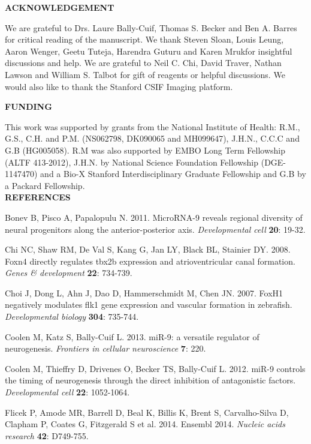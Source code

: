 \documentclass[]{article}
\begin{document}
\textbf{ACKNOWLEDGEMENT}

We are grateful to Drs. Laure Bally-Cuif, Thomas S. Becker and Ben A.
Barres for critical reading of the manuscript. We thank Steven Sloan,
Louis Leung, Aaron Wenger, Geetu Tuteja, Harendra Guturu and Karen
Mrukfor insightful discussions and help. We are grateful to Neil C. Chi,
David Traver, Nathan Lawson and William S. Talbot for gift of reagents
or helpful discussions. We would also like to thank the Stanford CSIF
Imaging platform.

\textbf{FUNDING}

This work was supported by grants from the National Institute of Health:
R.M., G.S., C.H. and P.M. (NS062798, DK090065 and MH099647), J.H.N.,
C.C.C and G.B (HG005058). R.M was also supported by EMBO Long Term
Fellowship (ALTF 413-2012), J.H.N. by National Science Foundation
Fellowship (DGE-1147470) and a Bio-X Stanford Interdisciplinary Graduate
Fellowship and G.B by a Packard Fellowship.\textbf{\\
REFERENCES}

\protect\hypertarget{_ENREF_1}{}{}Bonev B, Pisco A, Papalopulu N. 2011.
MicroRNA-9 reveals regional diversity of neural progenitors along the
anterior-posterior axis. \emph{Developmental cell} \textbf{20}: 19-32.

\protect\hypertarget{_ENREF_2}{}{}Chi NC, Shaw RM, De Val S, Kang G, Jan
LY, Black BL, Stainier DY. 2008. Foxn4 directly regulates tbx2b
expression and atrioventricular canal formation. \emph{Genes \&
development} \textbf{22}: 734-739.

\protect\hypertarget{_ENREF_3}{}{}Choi J, Dong L, Ahn J, Dao D,
Hammerschmidt M, Chen JN. 2007. FoxH1 negatively modulates flk1 gene
expression and vascular formation in zebrafish. \emph{Developmental
biology} \textbf{304}: 735-744.

\protect\hypertarget{_ENREF_4}{}{}Coolen M, Katz S, Bally-Cuif L. 2013.
miR-9: a versatile regulator of neurogenesis. \emph{Frontiers in
cellular neuroscience} \textbf{7}: 220.

\protect\hypertarget{_ENREF_5}{}{}Coolen M, Thieffry D, Drivenes O,
Becker TS, Bally-Cuif L. 2012. miR-9 controls the timing of neurogenesis
through the direct inhibition of antagonistic factors.
\emph{Developmental cell} \textbf{22}: 1052-1064.

\protect\hypertarget{_ENREF_6}{}{}Flicek P, Amode MR, Barrell D, Beal K,
Billis K, Brent S, Carvalho-Silva D, Clapham P, Coates G, Fitzgerald S
et al. 2014. Ensembl 2014. \emph{Nucleic acids research} \textbf{42}:
D749-755.
\end{document}
